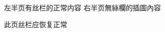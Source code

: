 \documentclass{ltc-guji}
\begin{document}
\clearpage

\begin{正文}

左半页有丝栏的正常内容
右半页無絲欄的插圖內容

\clearpage
{}

此页丝栏应恢复正常

\end{正文}
\end{document}
